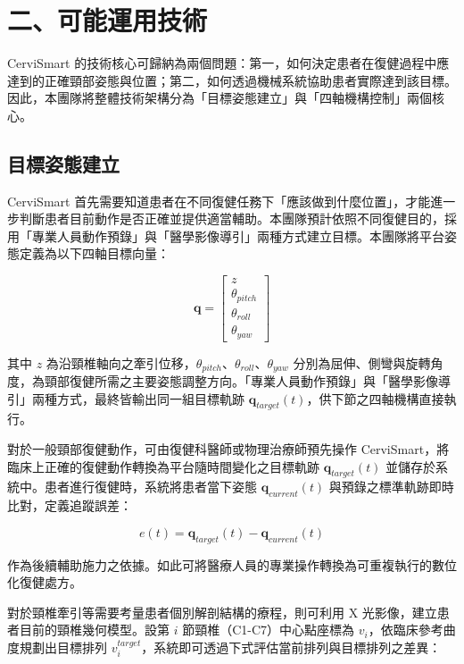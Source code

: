 \documentclass[12pt,a4paper]{article}
\begin{document}
\section{二、可能運用技術}

CerviSmart 的技術核心可歸納為兩個問題：第一，如何決定患者在復健過程中應達到的正確頸部姿態與位置；第二，如何透過機械系統協助患者實際達到該目標。因此，本團隊將整體技術架構分為「目標姿態建立」與「四軸機構控制」兩個核心。

\subsection{目標姿態建立}

CerviSmart 首先需要知道患者在不同復健任務下「應該做到什麼位置」，才能進一步判斷患者目前動作是否正確並提供適當輔助。本團隊預計依照不同復健目的，採用「專業人員動作預錄」與「醫學影像導引」兩種方式建立目標。本團隊將平台姿態定義為以下四軸目標向量：

\begin{equation}
\mathbf{q} = \begin{bmatrix} z \\ \theta_{pitch} \\ \theta_{roll} \\ \theta_{yaw} \end{bmatrix}
\label{eq:dof}
\end{equation}

其中 $z$ 為沿頸椎軸向之牽引位移，$\theta_{pitch}$、$\theta_{roll}$、$\theta_{yaw}$ 分別為屈伸、側彎與旋轉角度，為頸部復健所需之主要姿態調整方向。「專業人員動作預錄」與「醫學影像導引」兩種方式，最終皆輸出同一組目標軌跡 $\mathbf{q}_{target}(t)$，供下節之四軸機構直接執行。

對於一般頸部復健動作，可由復健科醫師或物理治療師預先操作 CerviSmart，將臨床上正確的復健動作轉換為平台隨時間變化之目標軌跡 $\mathbf{q}_{target}(t)$ 並儲存於系統中。患者進行復健時，系統將患者當下姿態 $\mathbf{q}_{current}(t)$ 與預錄之標準軌跡即時比對，定義追蹤誤差：

\begin{equation}
e(t) = \mathbf{q}_{target}(t) - \mathbf{q}_{current}(t)
\label{eq:tracking_error}
\end{equation}

作為後續輔助施力之依據。如此可將醫療人員的專業操作轉換為可重複執行的數位化復健處方。

對於頸椎牽引等需要考量患者個別解剖結構的療程，則可利用 X 光影像，建立患者目前的頸椎幾何模型。設第 $i$ 節頸椎（C1-C7）中心點座標為 $v_i$，依臨床參考曲度規劃出目標排列 $v_i^{target}$，系統即可透過下式評估當前排列與目標排列之差異：
\end{document}
